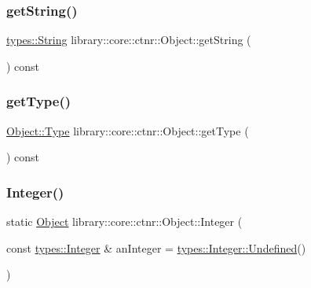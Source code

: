 \subsubsection{\texorpdfstring{get\+String()}{getString()}}
{\footnotesize\ttfamily \hyperlink{classlibrary_1_1core_1_1types_1_1String}{types\+::\+String} library\+::core\+::ctnr\+::\+Object\+::get\+String (\begin{DoxyParamCaption}{ }\end{DoxyParamCaption}) const}

\mbox{\label{classlibrary_1_1core_1_1ctnr_1_1Object_aa2cc92ae24eb576e0f06af4dce8b7151}} 
\subsubsection{\texorpdfstring{get\+Type()}{getType()}}
{\footnotesize\ttfamily \hyperlink{classlibrary_1_1core_1_1ctnr_1_1Object_a0766006ad111133d70349019551b31d6}{Object\+::\+Type} library\+::core\+::ctnr\+::\+Object\+::get\+Type (\begin{DoxyParamCaption}{ }\end{DoxyParamCaption}) const}

\mbox{\label{classlibrary_1_1core_1_1ctnr_1_1Object_a6746a69f0507b2c7ad8ebdf3d873b083}} 
\subsubsection{\texorpdfstring{Integer()}{Integer()}}
{\footnotesize\ttfamily static \hyperlink{classlibrary_1_1core_1_1ctnr_1_1Object}{Object} library\+::core\+::ctnr\+::\+Object\+::\+Integer (\begin{DoxyParamCaption}\item[{const \hyperlink{classlibrary_1_1core_1_1types_1_1Integer}{types\+::\+Integer} \&}]{an\+Integer = {\ttfamily \hyperlink{classlibrary_1_1core_1_1types_1_1Integer_a142c2df49031b787daf30673c73fcad7}{types\+::\+Integer\+::\+Undefined}()} }\end{DoxyParamCaption})\hspace{0.3cm}{\ttfamily [static]}}

